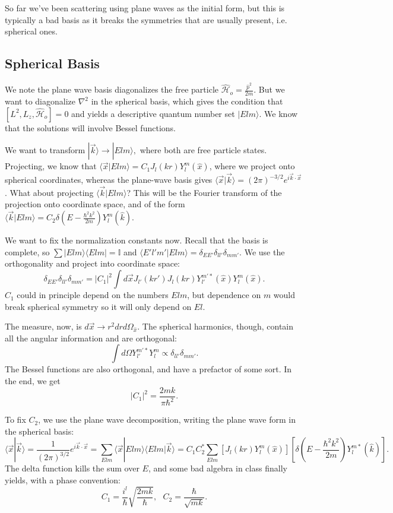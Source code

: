 \documentclass[fontsize=12pt]{scrartcl}
\newcommand{\bb}[1]{\mathbb{#1}}
\newcommand{\Id}{\bb{I}}
\newcommand{\la}{\langle}
\newcommand{\ra}{\rangle}
\newcommand{\mom}{\hat{p}}
\newcommand{\Ham}{\hat{\mathcal{H}}}
\begin{document}
So far we've been scattering using plane waves as the initial form, but this is typically a bad basis as it breaks the symmetries that are usually present, i.e. spherical ones.

\subsection{Spherical Basis}

We note the plane wave basis diagonalizes the free particle $\Ham_o=\frac{\mom^2}{2m}$. But we want to diagonalize $\nabla^2$ in the spherical basis, which gives the condition that $[L^2,L_z,\Ham_o]=0$ and yields a descriptive quantum number set $|Elm\ra$. We know that the solutions will involve Bessel functions.

We want to transform $|\vec{k}\ra \to |Elm\ra,$ where both are free particle states. Projecting, we know that $\la \vec{x}|Elm\ra = C_1 J_l(kr)Y_l^m(\hat{x})$, where we project onto spherical coordinates, whereas the plane-wave basis gives $\la\vec{x}|\vec{k}\ra = (2\pi)^{-3/2}e^{i\vec{k}\cdot\vec{x}}$. What about projecting $\la\vec{k}|Elm\ra$? This will be the Fourier transform of the projection onto coordinate space, and of the form $\la\vec{k}|Elm\ra = C_2 \delta(E-\frac{\hbar^2k^2}{2m})Y_l^m(\hat{k})$. 

We want to fix the normalization constants now. Recall that the basis is complete, so $\sum |Elm\ra\la Elm|=\Id$ and $\la E'l'm'|Elm\ra=\delta_{EE'}\delta_{ll'}\delta_{mm'}$. We use the orthogonality and project into coordinate space: $$\delta_{EE'}\delta_{ll'}\delta_{mm'} = |C_1|^2\int d\vec{x} J_{l'}(kr')J_l(kr)Y_{l'}^{m'*}(\hat{x})Y_l^m(\hat{x}).$$ $C_1$ could in principle depend on the numbers $Elm$, but dependence on $m$ would break spherical symmetry so it will only depend on $El$.

The measure, now, is $d\vec{x}\to r^2drd\Omega_{\hat{x}}$. The spherical harmonics, though, contain all the angular information and are orthogonal: $$\int d\Omega Y_{l'}^{m'*}Y_l^m\propto \delta_{ll'}\delta_{mm'}.$$ The Bessel functions are also orthogonal, and have a prefactor of some sort. In the end, we get $$|C_1|^2=\frac{2mk}{\pi\hbar^2}.$$

To fix $C_2$, we use the plane wave decomposition, writing the plane wave form in the spherical basis: $$\la\vec{x}|\vec{k}\ra = \frac{1}{(2\pi)^{3/2}}e^{i\vec{k}\cdot\vec{x}} = \sum_{Elm} \la \vec{x}|Elm\ra \la Elm|\vec{k}\ra = C_1C_2^*\sum_{Elm} \left[J_l(kr)Y_l^m(\hat{x})\right]\left[\delta(E-\frac{\hbar^2k^2}{2m})Y_l^{m*}(\hat{k})\right]. $$ The delta function kills the sum over $E$, and some bad algebra in class finally yields, with a phase convention: $$C_1=\frac{i^l}{\hbar}\sqrt{\frac{2mk}{\hbar}}, \ \ \ C_2=\frac{\hbar}{\sqrt{mk}}.$$
\end{document}
